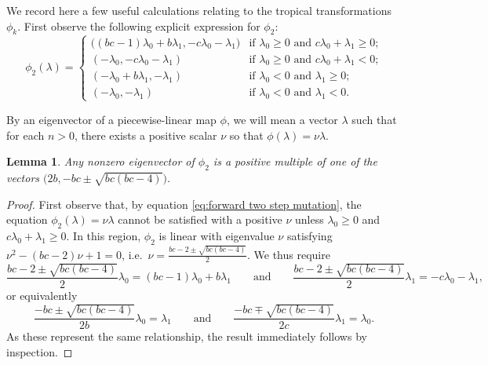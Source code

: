 \documentclass{amsart}
\newtheorem{lemma}[theorem]{Lemma}
\numberwithin{theorem}{section}
\begin{document}
  We record here a few useful calculations relating to the tropical transformations $\phi_k$.
  First observe the following explicit expression for $\phi_2$:
  \begin{equation}
    \label{eq:forward two step mutation}
    \phi_2(\lambda)
    =
    \begin{cases}
      \big((bc-1)\lambda_0+b\lambda_1, -c\lambda_0-\lambda_1\big) & \text{if $\lambda_0\ge 0$ and $c\lambda_0+\lambda_1\ge 0$;}\\
      (-\lambda_0, -c\lambda_0-\lambda_1) & \text{if $\lambda_0\ge 0$ and $c\lambda_0+\lambda_1<0$;}\\
      (-\lambda_0+b\lambda_1, -\lambda_1) & \text{if $\lambda_0<0$ and $\lambda_1\ge 0$;}\\
      (-\lambda_0,-\lambda_1) & \text{if $\lambda_0<0$ and $\lambda_1<0$.}
    \end{cases}
  \end{equation}

  By an eigenvector of a piecewise-linear map $\phi$, we will mean a vector $\lambda$ such that for each $n>0$, there exists a positive scalar $\nu$ so that $\phi(\lambda)=\nu\lambda$.
  \begin{lemma}
    Any nonzero eigenvector of $\phi_2$ is a positive multiple of one of the vectors $\big(2b,-bc\pm\sqrt{bc(bc-4)}\big)$.
  \end{lemma}
  \begin{proof}
    First observe that, by equation \eqref{eq:forward two step mutation}, the equation $\phi_2(\lambda)=\nu\lambda$ cannot be satisfied with a positive $\nu$ unless $\lambda_0\ge 0$ and $c\lambda_0+\lambda_1\ge 0$.
    In this region, $\phi_2$ is linear with eigenvalue $\nu$ satisfying $\nu^2-(bc-2)\nu+1=0$, i.e.~$\nu=\frac{bc-2\pm\sqrt{bc(bc-4)}}{2}$.
    We thus require 
    \[\frac{bc-2\pm\sqrt{bc(bc-4)}}{2}\lambda_0=(bc-1)\lambda_0+b\lambda_1 \qquad\text{and}\qquad \frac{bc-2\pm\sqrt{bc(bc-4)}}{2}\lambda_1= -c\lambda_0-\lambda_1,\]
    or equivalently
    \[\frac{-bc\pm\sqrt{bc(bc-4)}}{2b}\lambda_0=\lambda_1 \qquad\text{and}\qquad \frac{-bc\mp\sqrt{bc(bc-4)}}{2c}\lambda_1=\lambda_0.\]
    As these represent the same relationship, the result immediately follows by inspection.
  \end{proof}
\end{document}

